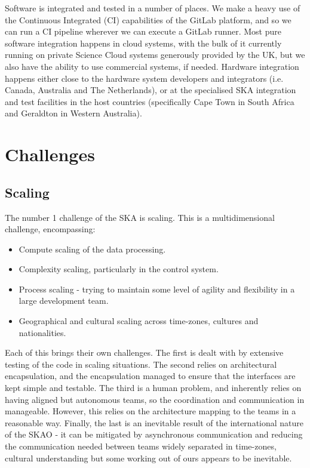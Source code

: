 \documentclass[a4paper,
               biblatex,     %
               keeplastbox,   %
               ]{jacow}
\begin{document}
Software is integrated and tested in a number of places. We make a heavy use of the Continuous Integrated (CI) capabilities of the GitLab platform, and so we can run a CI pipeline wherever we can execute a GitLab runner. Most pure software integration happens in cloud systems, with the bulk of it currently running on private Science Cloud systems generously provided by the UK, but we also have the ability to use commercial systems, if needed. Hardware integration happens either close to the hardware system developers and integrators (i.e. Canada, Australia and The Netherlands), or at the specialised SKA integration and test facilities in the host countries (specifically Cape Town in South Africa and Geraldton in Western Australia).




\section{Challenges}
\subsection{Scaling}
The number 1 challenge of the SKA is scaling. This is a multidimensional challenge, encompassing:
\begin{itemize}
	\item Compute scaling of the data processing.
	\item Complexity scaling, particularly in the control system.
	\item Process scaling - trying to maintain some level of agility and flexibility in a large development team.
	\item Geographical and cultural scaling across time-zones, cultures and nationalities.
\end{itemize}
Each of this brings their own challenges. The first is dealt with by extensive testing of the code in scaling situations. The second relies on architectural encapsulation, and the encapsulation managed to ensure that the interfaces are kept simple and testable. The third is a human problem, and inherently relies on having aligned but autonomous teams, so the coordination and communication in manageable. However, this relies on the architecture mapping to the teams in a reasonable way. Finally, the last is an inevitable result of the international nature of the SKAO - it can be mitigated by asynchronous communication and reducing the communication needed between teams widely separated in time-zones, cultural understanding but some working out of ours appears to be inevitable.
\end{document}
